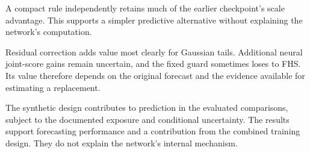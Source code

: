 A compact rule independently retains much of the earlier checkpoint's scale advantage. This supports a simpler predictive alternative without explaining the network's computation.

Residual correction adds value most clearly for Gaussian tails. Additional neural joint-score gains remain uncertain, and the fixed guard sometimes loses to FHS. Its value therefore depends on the original forecast and the evidence available for estimating a replacement.

The synthetic design contributes to prediction in the evaluated comparisons, subject to the documented exposure and conditional uncertainty. The results support forecasting performance and a contribution from the combined training design. They do not explain the network's internal mechanism.
